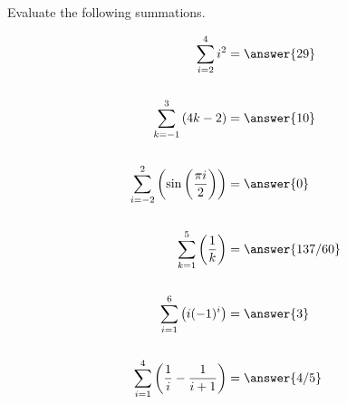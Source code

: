 \documentclass{ximera}
\author{Gregory Hartman \and Matthew Carr \and Bobby Ramsey}
\begin{document}
Evaluate the following summations.
\begin{exercise}
	\begin{align*}
		\sum_{i = 2}^{4} i^2 &= \answer{29} \\ \\
		\sum_{k = -1}^{3} \left(4k-2\right) &= \answer{10} \\ \\
		\sum_{i = -2}^{2} \left( \sin\left(\frac{\pi i}{2}\right) \right) &=  \answer{0} \\ \\
		\sum_{k = 1}^{5} \left( \frac{1}{k} \right) &= \answer{137/60}\\ \\
		\sum_{i = 1}^{6} \left( i(-1)^i \right) &= \answer{3}\\ \\
		\sum_{i = 1}^{4} \left( \frac{1}{i}-\frac{1}{i+1}\right) &= \answer{4/5}		
	\end{align*}


\end{exercise}
\end{document}
